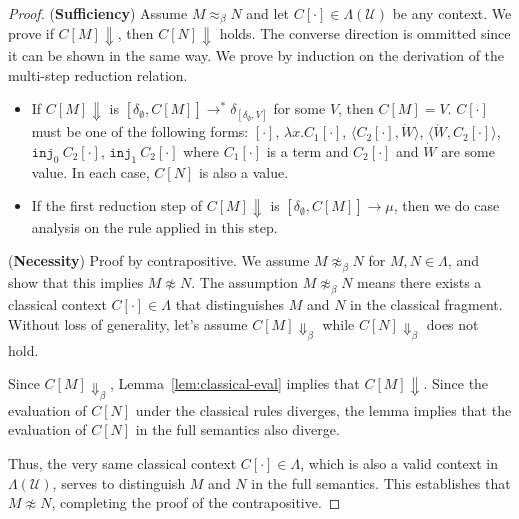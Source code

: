 \ConservTheorem*
\begin{proof}[Proof]
  (\textbf{Sufficiency})
  Assume $M\approx_\beta N$ and let $C[\cdot] \in \Lambda(\mathcal{U})$ be any context.
  We prove if $C[M] \Downarrow$, then $C[N] \Downarrow$ holds.
  The converse direction is ommitted since it can be shown in the same way.
  We prove by induction on the derivation of the multi-step reduction relation.
  \begin{itemize}
    \item If $C[M] \Downarrow$ is $[\delta_\emptyset, C[M]] \longrightarrow^* \delta_{[\delta_\emptyset,V]}$ for some $V$, then $C[M] = V$.
            $C[\cdot]$ must be one of the following forms: $[\cdot]$, $\lambda x.C_1[\cdot]$, $\langle C_2[\cdot], \dot{W}\rangle$, $\langle \dot{W}, C_2[\cdot]\rangle$, $\texttt{inj}_0\ C_2[\cdot]$, $\texttt{inj}_1\ C_2[\cdot]$ where $C_1[\cdot]$ is a term and $C_2[\cdot]$ and $\dot{W}$ are some value.
          In each case, $C[N]$ is also a value.
    \item If the first reduction step of $C[M] \Downarrow$ is $[\delta_\emptyset, C[M]] \longrightarrow \mu$, then we do case analysis on the rule applied in this step.
  \end{itemize}
  (\textbf{Necessity})
  Proof by contrapositive.
  We assume $M \not\approx_{\beta} N$ for $M, N \in \Lambda$, and show that this implies $M \not\approx N$.
  The assumption $M \not\approx_{\beta} N$ means there exists a classical context $C[\cdot] \in \Lambda$ that distinguishes $M$ and $N$ in the classical fragment.
  Without loss of generality, let's assume $C[M] \Downarrow_\beta$ while $C[N] \Downarrow_\beta$ does not hold.

  Since $C[M] \Downarrow_\beta$, Lemma~\ref{lem:classical-eval} implies that $C[M] \Downarrow$.
  Since the evaluation of $C[N]$ under the classical rules diverges, the lemma implies that the evaluation of $C[N]$ in the full semantics also diverge.

  Thus, the very same classical context $C[\cdot] \in \Lambda$, which is also a valid context in $\Lambda(\mathcal{U})$, serves to distinguish $M$ and $N$ in the full semantics.
  This establishes that $M \not\approx N$, completing the proof of the contrapositive.
\end{proof}